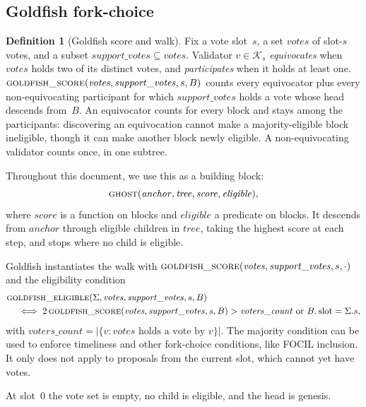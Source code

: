 \documentclass{article}
\theoremstyle{plain}
\theoremstyle{definition}
\newtheorem{definition}{Definition}
\theoremstyle{remark}
\newcommand{\slot}{\operatorname{slot}}
\newcommand{\committee}{\mathcal K}
\newcommand{\fname}[1]{\text{\textsc{#1}}}
\begin{document}
\subsection{Goldfish fork-choice}\label{sec:one-slot-ghost}

\begin{definition}[Goldfish score and walk]\label{def:goldfish-walk}
Fix a vote slot~$s$, a set $\mathit{votes}$ of slot-$s$ votes, and a subset
$\mathit{support\_votes}\subseteq\mathit{votes}$.
Validator $v\in\committee_s$ \emph{equivocates} when
$\mathit{votes}$ holds two of its distinct votes, and \emph{participates}
when it holds at least one.
$\Call{goldfish\_score}{\mathit{votes},\mathit{support\_votes},s,B}$ counts
every equivocator plus every non-equivocating participant for which
$\mathit{support\_votes}$ holds a vote whose head descends from~$B$.  An
equivocator counts for every block and stays among the participants:
discovering an equivocation cannot make a majority-eligible block
ineligible, though it can make another block newly eligible.  A non-equivocating validator counts
once, in one subtree.

Throughout this document, we use this as a building block:
\[
 \Call{ghost}
 {\mathit{anchor},\mathit{tree},\mathit{score},\mathit{eligible}},
\]
where $\mathit{score}$ is a function on blocks and $\mathit{eligible}$ a
predicate on blocks.  It descends from $\mathit{anchor}$ through eligible
children in $\mathit{tree}$, taking the highest score at each step, and stops
where no child is eligible.

Goldfish instantiates the walk with
$\fname{goldfish\_score}(\mathit{votes},\mathit{support\_votes},s,\cdot)$
and the eligibility
condition
\[
\begin{aligned}
 &\Call{goldfish\_eligible}{\Sigma,\mathit{votes},
   \mathit{support\_votes},s,B}\\
 &\quad\iff 2\,\Call{goldfish\_score}{\mathit{votes},
   \mathit{support\_votes},s,B}>\mathit{voters\_count}\text{ or }B.\slot=\Sigma.s,
\end{aligned}
\]
with $\mathit{voters\_count}=
|\{v:\mathit{votes}\text{ holds a vote by }v\}|$.
The majority condition can be used to enforce timeliness and other fork-choice conditions, like FOCIL inclusion. It only does not apply to
proposals from the current slot, which cannot yet have votes.
\end{definition}

At slot~$0$ the vote set is empty, no child is eligible, and the head is
genesis.
\end{document}
